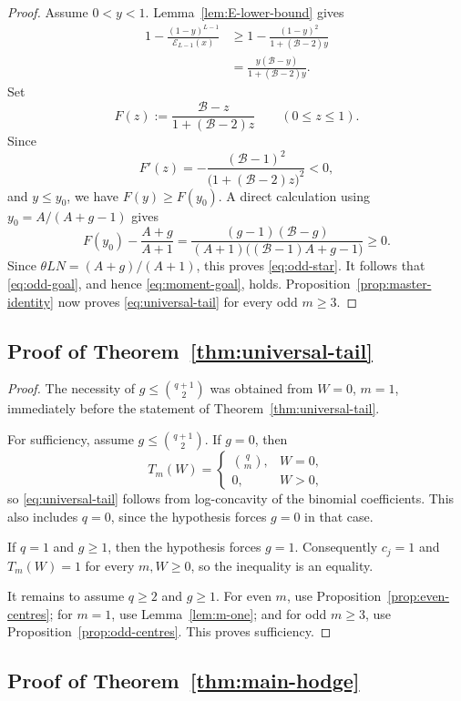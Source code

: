 \documentclass[12pt]{amsart}
\newcommand{\Bc}{\mathcal{B}}
\theoremstyle{plain}
\theoremstyle{definition}
\theoremstyle{remark}
\begin{document}
\begin{proof}
Assume \(0<y<1\).  Lemma~\ref{lem:E-lower-bound} gives
\[
\begin{aligned}
 1-\frac{(1-y)^{L-1}}{\mathcal E_{L-1}(x)}
 &\ge
 1-\frac{(1-y)^2}{1+(\Bc-2)y}\\
 &=\frac{y(\Bc-y)}{1+(\Bc-2)y}.
\end{aligned}
\]
Set
\[
 F(z):=\frac{\Bc-z}{1+(\Bc-2)z}
 \qquad(0\le z\le1).
\]
Since
\[
 F'(z)=-
 \frac{(\Bc-1)^2}
 {\bigl(1+(\Bc-2)z\bigr)^2}<0,
\]
and \(y\le y_0\), we have \(F(y)\ge F(y_0)\).  A direct calculation
using \(y_0=A/(A+g-1)\) gives
\[
 F(y_0)-\frac{A+g}{A+1}
 =
 \frac{(g-1)(\Bc-g)}
 {(A+1)\bigl((\Bc-1)A+g-1\bigr)}
 \ge0.
\]
Since \(\theta LN=(A+g)/(A+1)\), this proves
\eqref{eq:odd-star}.  It follows that \eqref{eq:odd-goal}, and hence
\eqref{eq:moment-goal}, holds.  Proposition~\ref{prop:master-identity}
now proves \eqref{eq:universal-tail} for every odd \(m\ge3\).
\end{proof}

\subsection{Proof of Theorem~\ref{thm:universal-tail}}

\begin{proof}
The necessity of \(g\le\binom{q+1}{2}\) was obtained from
\(W=0\), \(m=1\), immediately before the statement of
Theorem~\ref{thm:universal-tail}.

For sufficiency, assume \(g\le\binom{q+1}{2}\).  If \(g=0\), then
\[
 T_m(W)=
 \begin{cases}
  \binom qm,&W=0,\\
  0,&W>0,
 \end{cases}
\]
so \eqref{eq:universal-tail} follows from log-concavity of the binomial
coefficients.  This also includes \(q=0\), since the hypothesis forces
\(g=0\) in that case.

If \(q=1\) and \(g\ge1\), then the hypothesis forces \(g=1\).
Consequently \(c_j=1\) and \(T_m(W)=1\) for every \(m,W\ge0\), so the
inequality is an equality.

It remains to assume \(q\ge2\) and \(g\ge1\).  For even \(m\), use
Proposition~\ref{prop:even-centres}; for \(m=1\), use
Lemma~\ref{lem:m-one}; and for odd \(m\ge3\), use
Proposition~\ref{prop:odd-centres}.  This proves sufficiency.
\end{proof}

\subsection{Proof of Theorem~\ref{thm:main-hodge}}
\end{document}
